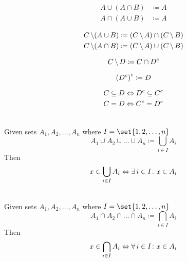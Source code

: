 \begin{definition}
\begin{align}
    A \cup (A \cap B) &\coloneqq A \\
    A \cap (A \cup B) &\coloneqq A
\end{align}
\end{definition}

\begin{definition}
\begin{align}
    C \operatorname{\backslash} (A \cup B) &\coloneqq (C \operatorname{\backslash} A) \cap (C \operatorname{\backslash} B) \\
    C \operatorname{\backslash} (A \cap B) &\coloneqq (C \operatorname{\backslash} A) \cup (C \operatorname{\backslash} B)
\end{align}
\end{definition}

\begin{definition}
\begin{equation}
    C \operatorname{\backslash} D \coloneqq C \cap {D}^{c}
\end{equation}
\end{definition}

\begin{definition}
\begin{equation}
    {({D}^{c})}^{c} \coloneqq D
\end{equation}
\end{definition}

\begin{definition}[Contraposition]
\begin{align}
    C \subseteq D &\Leftrightarrow {D}^{c} \subseteq {C}^{c} \\
    C = D &\Leftrightarrow {C}^{c} = {D}^{c}
\end{align}
\end{definition}

\begin{definition}\ \\
    Given sets $A_1, A_2, \dots, A_n$ where $I = \set{1, 2, \dots, n}$
    \begin{equation}
        A_1 \cup A_2 \cup \dots \cup A_n \coloneqq \bigcup_{i \in I} A_i
    \end{equation}
    Then
    \begin{equation}
        x \in \bigcup_{i \in I} A_i \Leftrightarrow \operatorname{\exists} i \in I \colon x \in A_i
    \end{equation}
\end{definition}

\begin{definition}\ \\
    Given sets $A_1, A_2, \dots, A_n$ where $I = \set{1, 2, \dots, n}$
    \begin{equation}
        A_1 \cap A_2 \cap \dots \cap A_n \coloneqq \bigcap_{i \in I} A_i
    \end{equation}
    Then
    \begin{equation}
        x \in \bigcap_{i \in I} A_i \Leftrightarrow \operatorname{\forall} i \in I \colon x \in A_i
    \end{equation}
\end{definition}
